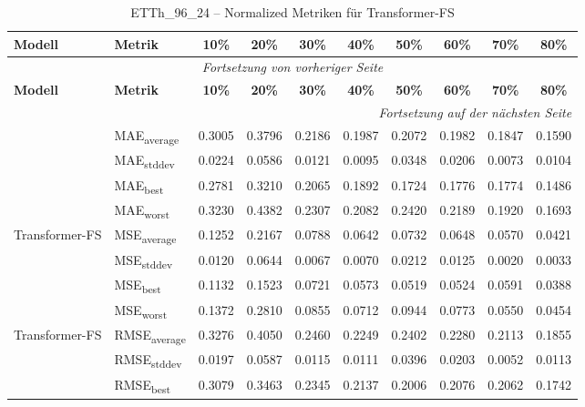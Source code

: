 {\small
\begin{longtable}{l l c c c c c c c c}
    \toprule
    \textbf{Modell} & \textbf{Metrik} & \textbf{10\%} & \textbf{20\%} & \textbf{30\%} & \textbf{40\%} & \textbf{50\%} & \textbf{60\%} & \textbf{70\%} & \textbf{80\%} \\
    \midrule
    \endfirsthead
    \multicolumn{10}{c}{\textit{Fortsetzung von vorheriger Seite}} \\
    \toprule
    \textbf{Modell} & \textbf{Metrik} & \textbf{10\%} & \textbf{20\%} & \textbf{30\%} & \textbf{40\%} & \textbf{50\%} & \textbf{60\%} & \textbf{70\%} & \textbf{80\%} \\
    \midrule
    \endhead
    \midrule
    \multicolumn{10}{r}{\textit{Fortsetzung auf der nächsten Seite}} \\
    \midrule
    \endfoot
    \bottomrule
    \caption{ETTh_96_24 -- Normalized Metriken für Transformer-FS}
    \label{tab:etth_96_24_normalized_transformer-fs}
    \endlastfoot
\multirow{4}{*}{Transformer-FS} & MAE\textsubscript{average} & 0.3005 & 0.3796 & 0.2186 & 0.1987 & 0.2072 & 0.1982 & 0.1847 & 0.1590 \\
 & MAE\textsubscript{stddev} & 0.0224 & 0.0586 & 0.0121 & 0.0095 & 0.0348 & 0.0206 & 0.0073 & 0.0104 \\
 & MAE\textsubscript{best} & 0.2781 & 0.3210 & 0.2065 & 0.1892 & 0.1724 & 0.1776 & 0.1774 & 0.1486 \\
 & MAE\textsubscript{worst} & 0.3230 & 0.4382 & 0.2307 & 0.2082 & 0.2420 & 0.2189 & 0.1920 & 0.1693 \\
\cmidrule(lr){2-10}
\multirow{4}{*}{Transformer-FS} & MSE\textsubscript{average} & 0.1252 & 0.2167 & 0.0788 & 0.0642 & 0.0732 & 0.0648 & 0.0570 & 0.0421 \\
 & MSE\textsubscript{stddev} & 0.0120 & 0.0644 & 0.0067 & 0.0070 & 0.0212 & 0.0125 & 0.0020 & 0.0033 \\
 & MSE\textsubscript{best} & 0.1132 & 0.1523 & 0.0721 & 0.0573 & 0.0519 & 0.0524 & 0.0591 & 0.0388 \\
 & MSE\textsubscript{worst} & 0.1372 & 0.2810 & 0.0855 & 0.0712 & 0.0944 & 0.0773 & 0.0550 & 0.0454 \\
\cmidrule(lr){2-10}
\multirow{4}{*}{Transformer-FS} & RMSE\textsubscript{average} & 0.3276 & 0.4050 & 0.2460 & 0.2249 & 0.2402 & 0.2280 & 0.2113 & 0.1855 \\
 & RMSE\textsubscript{stddev} & 0.0197 & 0.0587 & 0.0115 & 0.0111 & 0.0396 & 0.0203 & 0.0052 & 0.0113 \\
 & RMSE\textsubscript{best} & 0.3079 & 0.3463 & 0.2345 & 0.2137 & 0.2006 & 0.2076 & 0.2062 & 0.1742 \\

\end{longtable}}
